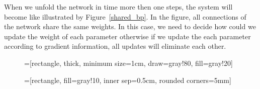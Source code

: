 \documentclass[officiallayout]{tktla}
\begin{document}
When we unfold the network in time more then one steps, the system will become like illustrated by Figure~\ref{shared_bp}. In the figure, all connections of the network share the same weights. In this case, we need to decide how could we update the weight of each parameter otherwise if we update the each parameter according to gradient information, all updates will eliminate each other.
\begin{figure}[h!]
  \centering
=[rectangle,
                                    thick,
                                    minimum size=1cm,
                                    draw=gray!80,
                                    fill=gray!20]


=[rectangle,
                                                fill=gray!10,
                                                inner sep=0.5cm,
                                                rounded corners=5mm]

\end{figure}
\end{document}
